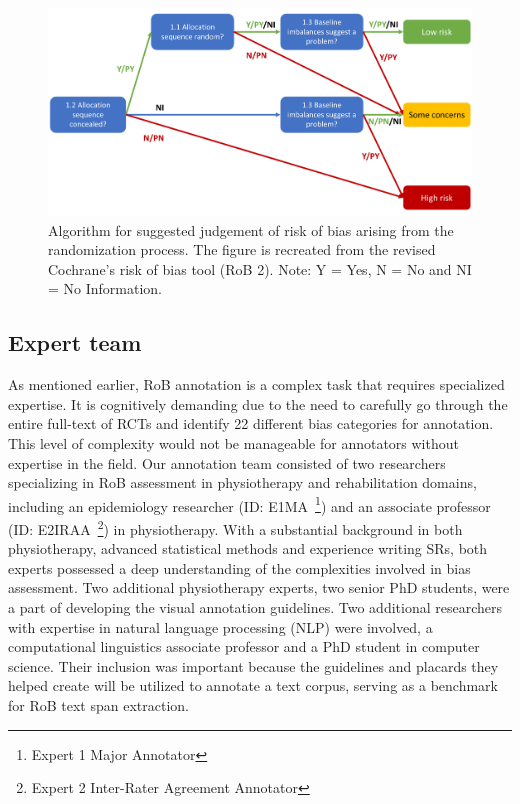 \documentclass[sn-mathphys,Numbered]{sn-jnl}%
\theoremstyle{thmstyleone}%
\theoremstyle{thmstyletwo}%
\theoremstyle{thmstylethree}%
\begin{document}
%
%
%
\begin{figure}
    \centering
    \includegraphics[width=0.80\columnwidth]{figures/flowchart.pdf}
    \caption{Algorithm for suggested judgement of risk of bias arising from the randomization process. The figure is recreated from the revised Cochrane's risk of bias tool (RoB 2). Note: Y = Yes, N = No and NI = No Information.~\cite{sterne2019rob}}
    \label{fig:flowchart}
\end{figure}
%
%
%

%
%
%
\subsection{Expert team}
\label{experts}
%
As mentioned earlier, RoB annotation is a complex task that requires specialized expertise.
It is cognitively demanding due to the need to carefully go through the entire full-text of RCTs and identify 22 different bias categories for annotation.
This level of complexity would not be manageable for annotators without expertise in the field.
Our annotation team consisted of two researchers specializing in RoB assessment in physiotherapy and rehabilitation domains, including an epidemiology researcher (ID: E1MA~\footnote{Expert 1 Major Annotator}) and an associate professor (ID: E2IRAA~\footnote{Expert 2 Inter-Rater Agreement Annotator}) in physiotherapy.
With a substantial background in both physiotherapy, advanced statistical methods and experience writing SRs, both experts possessed a deep understanding of the complexities involved in bias assessment.
Two additional physiotherapy experts, two senior PhD students, were a part of developing the visual annotation guidelines.
Two additional researchers with expertise in natural language processing (NLP) were involved, a computational linguistics associate professor and a PhD student in computer science.
Their inclusion was important because the guidelines and placards they helped create will be utilized to annotate a text corpus, serving as a benchmark for RoB text span extraction.
%
%
%
\end{document}
